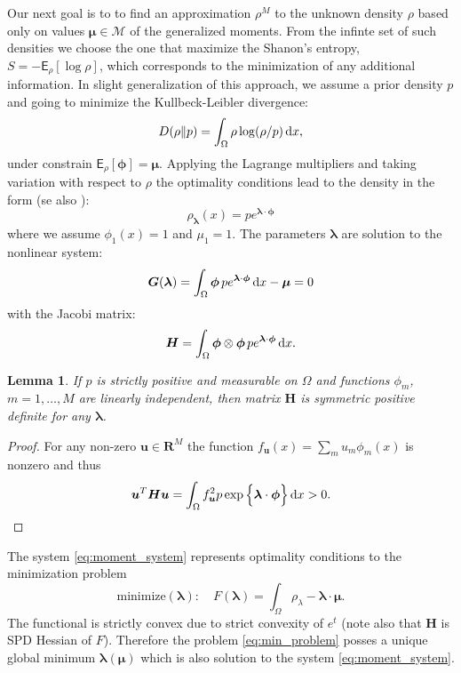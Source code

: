 \documentclass{article}
\newtheorem{lemma}[theorem]{Lemma}
\def\d{\,{\rm d}}               %
\def\vc#1{\mathbf{\boldsymbol{#1}}}     %
\def\tn#1{\boldsymbol{#1}}
\def \E{{\mathsf E}}
\def\R{\mathbf{R}}
\def\vl{{\vc\lambda}}
\def\vmu{\vc\mu}
\def\vphi{\vc\phi}
\begin{document}
Our next goal is to to find an approximation $\rho^M$ to the unknown density $\rho$ based only on values $\vmu \in \mathcal M$ of the generalized moments. From the infinte set of such densities we choose the one that maximize the Shanon's entropy,
$S = -\E_\rho[\log \rho]$,
which corresponds to the minimization of any additional information. 
In slight generalization of this approach, we assume a prior density $p$ and going to minimize the Kullbeck-Leibler divergence:
\[
    D(\rho\Vert p) = \int_\Omega \rho \log(\rho / p) \d x,
\]
under constrain $\E_\rho[ \vphi ] = \vmu$. 
Applying the Lagrange multipliers and taking variation with respect to $\rho$ the optimality conditions lead to the density in the form (se also \cite{...}):
\[
    \rho_{\vl}(x) = p e^{\vl\cdot\vphi}
\]
where we assume $\phi_1(x) = 1$ and $\mu_1 =1$. The parameters $\vl$ are solution
to the nonlinear system:
\begin{equation}
    \label{eq:moment_system}
    \vc G(\vl) = \int_\Omega \vphi\, p e^{\vl\cdot \vphi}\d x - \vmu = 0
\end{equation}
with the Jacobi matrix:
\[
    \tn H = \int_\Omega \vphi \otimes \vphi\, 
    p e^{\vl\cdot\vphi} \d x.
\]
\begin{lemma}
If $p$ is strictly positive and measurable on $\Omega$ and functions $\phi_m$,  $m=1,\dots,M$ are linearly independent, then matrix $\tn H$ is symmetric positive definite for any $\vl$.
\end{lemma}
\begin{proof}
For any non-zero $\vc u \in \R^M$ the function $f_{\vc u}(x) = \sum_m u_m \phi_m(x)$ is nonzero and thus
\[
    \vc u^T \tn H \vc u = \int_{\Omega} f_{\vc u}^2 p \exp\Big\{ \vc\lambda\cdot \vc\phi\Big\} \d x > 0.
\]
\end{proof}
The system \eqref{eq:moment_system} represents optimality conditions to the minimization problem
\begin{equation}
    \label{eq:min_problem}
    \text{minimize}(\vc\lambda):\quad F(\vl) = \int_{\Omega} \rho_{\lambda} - \vl\cdot\vmu.
\end{equation}
The functional is strictly convex due to strict convexity of $e^t$ (note also that $\tn H$ is SPD Hessian of $F$). 
Therefore the problem \eqref{eq:min_problem} posses a unique global minimum $\vl(\vmu)$ which is
also solution to the system \eqref{eq:moment_system}.
\end{document}
